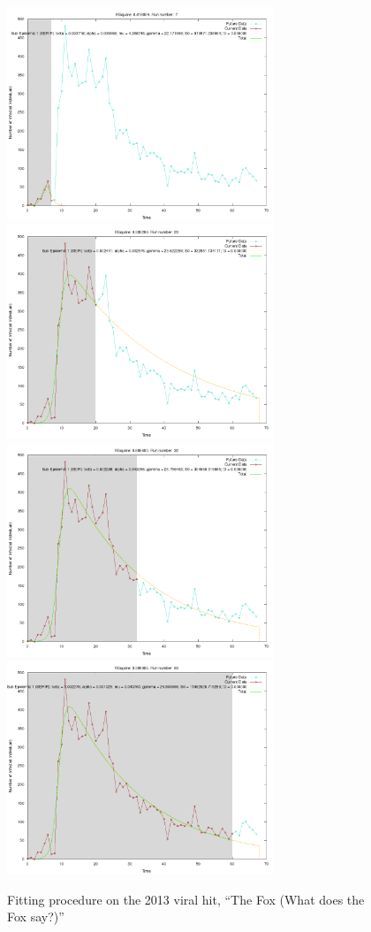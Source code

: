 \begin{centering}
\begin{figure}[h!]
  \includegraphics[width=8cm]{images/single/fox1.png}
  \includegraphics[width=8cm]{images/single/fox2.png}
  \includegraphics[width=8cm]{images/single/fox3.png}
  \includegraphics[width=8cm]{images/single/fox4.png}
  \caption{Fitting procedure on the 2013 viral hit, ``The Fox (What
    does the Fox say?)''}
\label{fig:fox1}
  \end{figure}
\end{centering}


